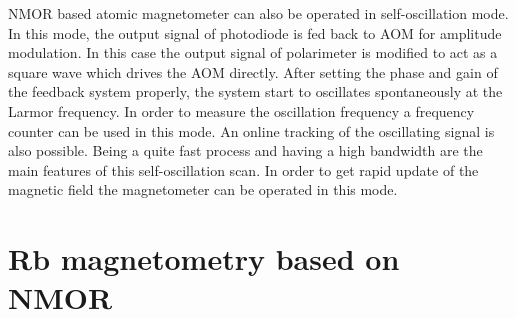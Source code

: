 NMOR based atomic magnetometer can also be operated in self-oscillation mode\cite{PhysRevA.62.043403}. In this mode, the output signal
of photodiode is fed back to AOM for amplitude modulation. In this
case the output signal of polarimeter is modified to act as a square
wave which drives the AOM directly. After setting the phase and gain
of the feedback system properly, the system start to oscillates
spontaneously at the Larmor frequency. In order to measure the
oscillation frequency a frequency counter can be used in this mode. An
online tracking of the oscillating signal is also possible.
 Being a quite fast process and having a high bandwidth are
the main features of this self-oscillation scan. In order to get rapid update of the magnetic field the magnetometer can be operated in this
mode.

\section{Rb magnetometry based on NMOR}

